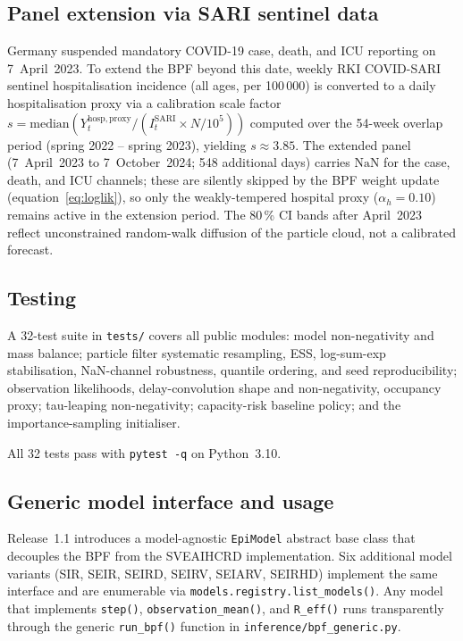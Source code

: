 \documentclass[11pt]{article}
\begin{document}
\subsection{Panel extension via SARI sentinel data}
\label{sec:sari}

Germany suspended mandatory COVID-19 case, death, and ICU reporting on
7~April~2023.
To extend the BPF beyond this date, weekly RKI COVID-SARI sentinel
hospitalisation incidence (all ages, per 100\,000) is converted to a
daily hospitalisation proxy via a calibration scale factor
$s = \mathrm{median}\!\left(
  Y_t^{\mathrm{hosp,proxy}} / (I_t^{\mathrm{SARI}} \times N/10^5)
\right)$
computed over the 54-week overlap period (spring 2022 -- spring 2023),
yielding $s\approx 3.85$.
The extended panel (7~April~2023 to 7~October~2024; 548 additional days)
carries $\mathrm{NaN}$ for the case, death, and ICU channels;
these are silently skipped by the BPF weight update
(equation~\eqref{eq:loglik}), so only the weakly-tempered hospital
proxy ($\alpha_h=0.10$) remains active in the extension period.
The 80\,\% CI bands after April~2023 reflect unconstrained
random-walk diffusion of the particle cloud, not a calibrated forecast.

\subsection{Testing}

A 32-test suite in \texttt{tests/} covers all public modules:
model non-negativity and mass balance; particle filter systematic
resampling, ESS, log-sum-exp stabilisation, NaN-channel robustness,
quantile ordering, and seed reproducibility; observation likelihoods,
delay-convolution shape and non-negativity, occupancy proxy; tau-leaping
non-negativity; capacity-risk baseline policy; and the importance-sampling
initialiser.

All 32 tests pass with \texttt{pytest -q} on Python~3.10.

\subsection{Generic model interface and usage}
\label{sec:usage}

Release~1.1 introduces a model-agnostic \texttt{EpiModel} abstract base
class that decouples the BPF from the SVEAIHCRD implementation.
Six additional model variants (SIR, SEIR, SEIRD, SEIRV, SEIARV, SEIRHD)
implement the same interface and are enumerable via
\texttt{models.registry.list\_models()}.
Any model that implements \texttt{step()}, \texttt{observation\_mean()},
and \texttt{R\_eff()} runs transparently through the generic
\texttt{run\_bpf()} function in \texttt{inference/bpf\_generic.py}.
\end{document}
